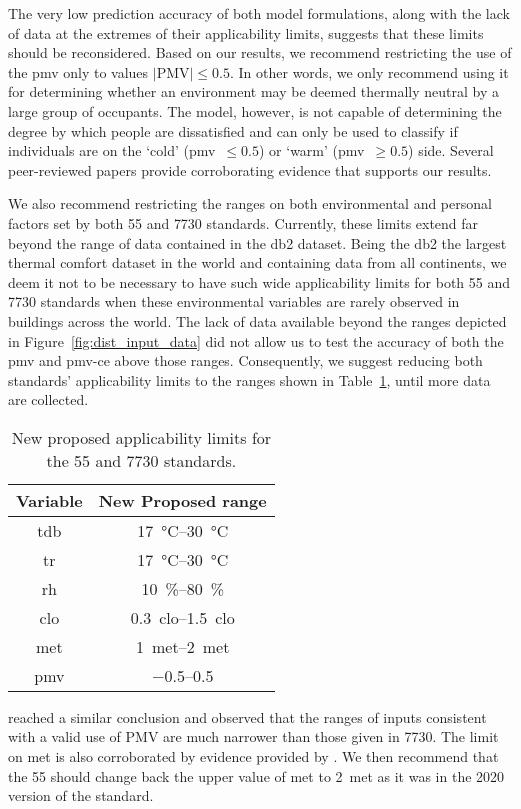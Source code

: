 The very low prediction accuracy of both model formulations, along with the lack of data at the extremes of their applicability limits, suggests that these limits should be reconsidered.
Based on our results, we recommend restricting the use of the \ac{pmv} only to values $\lvert \textrm{PMV}\lvert \leq 0.5$.
In other words, we only recommend using it for determining whether an environment may be deemed thermally neutral by a large group of occupants.
The model, however, is not capable of determining the degree by which people are dissatisfied and can only be used to classify if individuals are on the `cold' (\ac{pmv}~$\leq 0.5$) or `warm' (\ac{pmv}~$\geq 0.5$) side.
Several peer-reviewed papers \cite{Cheung2019, Yao2022, kim2019thermal, tartarini2018thermal, Humphreys2002, doherty_evaluation_1988} provide corroborating evidence that supports our results.

We also recommend restricting the ranges on both environmental and personal factors set by both \gls{55} and \gls{7730} standards.
Currently, these limits extend far beyond the range of data contained in the \ac{db2} dataset.
Being the \ac{db2} the largest thermal comfort dataset in the world and containing data from all continents, we deem it not to be necessary to have such wide applicability limits for both \gls{55} and \gls{7730} standards when these environmental variables are rarely observed in buildings across the world.
The lack of data available beyond the ranges depicted in Figure~\ref{fig:dist_input_data} did not allow us to test the accuracy of both the \ac{pmv} and \ac{pmv-ce} above those ranges.
Consequently, we suggest reducing both standards' applicability limits to the ranges shown in Table~\ref{tab:ranges}, until more data are collected.
\begin{table}[htb!]
    \centering
    \begin{tabular}{cc}
        \toprule
        Variable & New Proposed range \\
        \midrule
        \ac{tdb} & \qtyrange{17}{30}{\celsius} \\
        \ac{tr} & \qtyrange{17}{30}{\celsius} \\
        \ac{rh} & \qtyrange{10}{80}{\percent} \\
        \ac{clo} & \qtyrange{0.3}{1.5}{clo} \\
        \ac{met} & \qtyrange{1}{2}{met} \\
        \ac{pmv} & \numrange{-.5}{.5}{} \\
        \bottomrule
    \end{tabular}
    \caption{New proposed applicability limits for the \gls{55} and \gls{7730} standards.}
    \label{tab:ranges}
\end{table}
 reached a similar conclusion and observed that the ranges of inputs consistent with a valid use of PMV are much narrower than those given in \gls{7730}.
The limit on \ac{met} is also corroborated by evidence provided by .
We then recommend that the \gls{55} should change back the upper value of \ac{met} to \qty{2}{met} as it was in the 2020 version of the standard.

